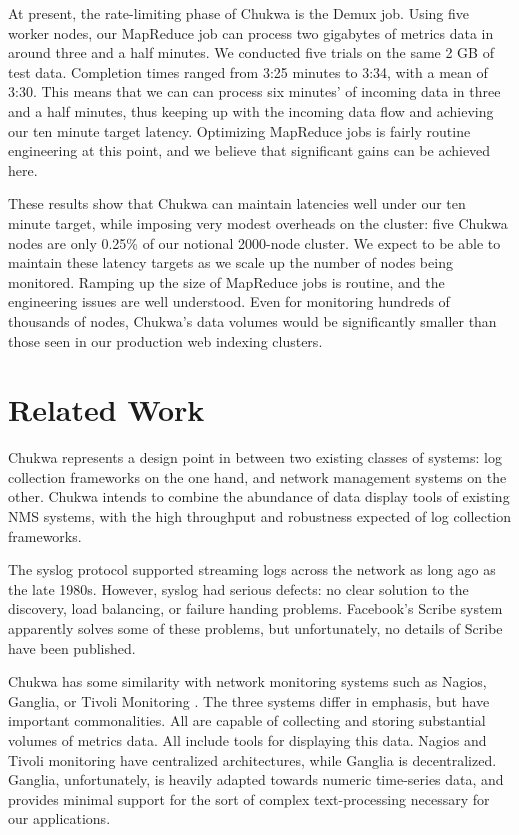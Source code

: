 \documentclass[letterpaper,twocolumn,10pt]{article}
\begin{document}
At present, the rate-limiting phase of Chukwa is the Demux job. Using five worker nodes, our MapReduce job can process two gigabytes of metrics data in around three and a half minutes. We conducted five trials on the same 2 GB of test data.  Completion times ranged from 3:25 minutes to 3:34, with a mean of 3:30.  This means that we can can process six minutes' of incoming data in three and a half minutes, thus keeping up with the incoming data flow and achieving our ten minute target latency.  
Optimizing MapReduce jobs is fairly routine engineering at this point, and we believe that significant gains can be achieved here. 

These results show that Chukwa can maintain latencies well under our ten minute target, while imposing very modest overheads on the cluster: five Chukwa nodes are only 0.25\% of our notional 2000-node cluster. We expect to be able to maintain these latency targets as we scale up the number of nodes being monitored.  Ramping up the size of MapReduce jobs is routine, and the engineering issues are well understood. Even for monitoring hundreds of thousands of nodes, Chukwa's data volumes would be significantly smaller than those seen in our production web indexing clusters.


\section{Related Work}

Chukwa represents a design point in between two existing classes of systems: log collection frameworks on the one hand, and network management systems on the other.  Chukwa intends to combine the abundance of data display tools of existing NMS systems, with the high throughput and robustness expected of log collection frameworks.

The syslog protocol supported streaming logs across the network as long ago as the late 1980s.  However, syslog had serious defects: no clear solution to the discovery, load balancing, or failure handing problems.  Facebook's Scribe \cite{scribe} system apparently solves some of these problems, but unfortunately, no details of Scribe have been published.

Chukwa has some similarity with network monitoring systems such as Nagios, Ganglia, or Tivoli Monitoring \cite{Ganglia, Nagios, tivmon}. The three systems differ in emphasis, but have important commonalities.  All are capable of collecting and storing substantial volumes of metrics data. All include tools for displaying this data.  Nagios and Tivoli monitoring have centralized architectures, while Ganglia is decentralized.  Ganglia, unfortunately, is heavily adapted towards numeric time-series data, and provides minimal support for the sort of complex text-processing necessary for our applications.
\end{document}
